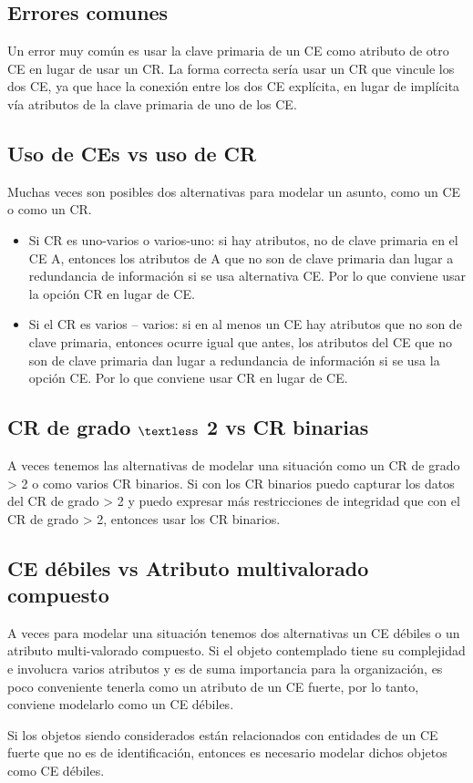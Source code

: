 \documentclass[12pt,a4paper]{report}
\begin{document}
		\subsection{Errores comunes}
			\par Un error muy común es usar la clave primaria de un CE como atributo de otro CE en lugar de usar un CR. La forma correcta sería usar un CR que vincule los dos CE, ya que hace la conexión entre los dos CE explícita, en lugar de implícita vía atributos de la clave primaria de uno de los CE.	
		
		\subsection{Uso de CEs vs uso de CR}
			\par Muchas veces son posibles dos alternativas para modelar un asunto, como un CE o como un CR.
			\begin{itemize}
				\item Si CR es uno-varios o varios-uno: si hay atributos, no de clave primaria en el CE A, entonces los atributos de A que no son de clave primaria dan lugar a redundancia de información si se usa alternativa CE. Por lo que conviene usar la opción CR en lugar de CE.
				\item Si el CR es varios – varios: si en al menos un CE hay atributos que no son de clave primaria, entonces ocurre igual que antes, los atributos del CE que no son de clave primaria dan lugar a redundancia de información si se usa la opción CE. Por lo que conviene usar CR en lugar de CE.
			\end{itemize}
		
		\subsection{CR de grado $\textless$ 2 vs CR binarias}
			\par A veces tenemos las alternativas de modelar una situación como un CR de grado > 2 o como varios CR binarios. Si con los CR binarios puedo capturar los datos del CR de grado > 2 y puedo expresar más restricciones de integridad que con el CR de grado > 2, entonces usar los CR binarios.
		
		\subsection{CE débiles vs Atributo multivalorado compuesto}
			\par A veces para modelar una situación tenemos dos alternativas un CE débiles o un atributo multi-valorado compuesto. Si el objeto contemplado tiene su complejidad e involucra varios atributos y es de suma importancia para la organización, es poco conveniente tenerla como un atributo de un CE fuerte, por lo tanto, conviene modelarlo como un CE débiles.
			\par Si los objetos siendo considerados están relacionados con entidades de un CE fuerte que no es de identificación, entonces es necesario modelar dichos objetos como CE débiles.
		
\end{document}
